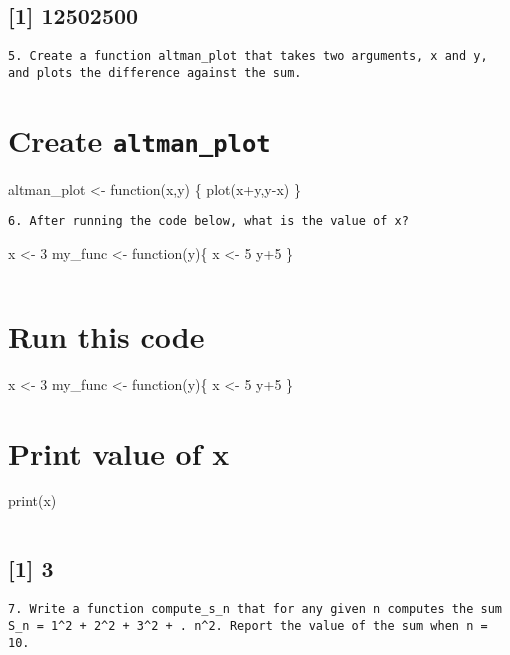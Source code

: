 \documentclass[
]{article}
\begin{document}
\hypertarget{section-3}{%
\subsection{{[}1{]} 12502500}\label{section-3}}

\begin{verbatim}
5. Create a function altman_plot that takes two arguments, x and y, and plots the difference against the sum.
\end{verbatim}

\hypertarget{create-altman_plot}{%
\section{\texorpdfstring{Create
\texttt{altman\_plot}}{Create altman\_plot}}\label{create-altman_plot}}

altman\_plot \textless- function(x,y) \{ plot(x+y,y-x) \}

\begin{verbatim}
6. After running the code below, what is the value of x?
\end{verbatim}

x \textless- 3 my\_func \textless- function(y)\{ x \textless- 5 y+5 \}

\begin{verbatim}
\end{verbatim}

\hypertarget{run-this-code}{%
\section{Run this code}\label{run-this-code}}

x \textless- 3 my\_func \textless- function(y)\{ x \textless- 5 y+5 \}

\hypertarget{print-value-of-x}{%
\section{Print value of x}\label{print-value-of-x}}

print(x)

\begin{verbatim}
\end{verbatim}

\hypertarget{section-4}{%
\subsection{{[}1{]} 3}\label{section-4}}

\begin{verbatim}
7. Write a function compute_s_n that for any given n computes the sum S_n = 1^2 + 2^2 + 3^2 + . n^2. Report the value of the sum when n = 10.
\end{verbatim}
\end{document}
